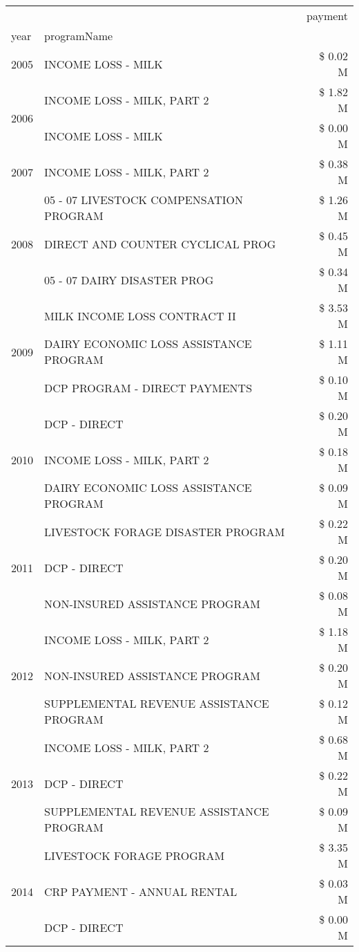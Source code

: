 \begin{tabular}{llr}
\toprule
 &  & payment \\
year & programName &  \\
\midrule
2005 & INCOME LOSS - MILK & \$ 0.02 M \\
\cline{1-3}
\multirow[t]{2}{*}{2006} & INCOME LOSS - MILK, PART 2 & \$ 1.82 M \\
 & INCOME LOSS - MILK & \$ 0.00 M \\
\cline{1-3}
2007 & INCOME LOSS - MILK, PART 2 & \$ 0.38 M \\
\cline{1-3}
\multirow[t]{3}{*}{2008} & 05 - 07 LIVESTOCK COMPENSATION PROGRAM & \$ 1.26 M \\
 & DIRECT AND COUNTER CYCLICAL PROG & \$ 0.45 M \\
 & 05 - 07 DAIRY DISASTER PROG & \$ 0.34 M \\
\cline{1-3}
\multirow[t]{3}{*}{2009} & MILK INCOME LOSS CONTRACT II & \$ 3.53 M \\
 & DAIRY ECONOMIC LOSS ASSISTANCE PROGRAM & \$ 1.11 M \\
 & DCP PROGRAM - DIRECT PAYMENTS & \$ 0.10 M \\
\cline{1-3}
\multirow[t]{3}{*}{2010} & DCP - DIRECT & \$ 0.20 M \\
 & INCOME LOSS - MILK, PART 2 & \$ 0.18 M \\
 & DAIRY ECONOMIC LOSS ASSISTANCE PROGRAM & \$ 0.09 M \\
\cline{1-3}
\multirow[t]{3}{*}{2011} & LIVESTOCK FORAGE DISASTER PROGRAM & \$ 0.22 M \\
 & DCP - DIRECT & \$ 0.20 M \\
 & NON-INSURED ASSISTANCE PROGRAM & \$ 0.08 M \\
\cline{1-3}
\multirow[t]{3}{*}{2012} & INCOME LOSS - MILK, PART 2 & \$ 1.18 M \\
 & NON-INSURED ASSISTANCE PROGRAM & \$ 0.20 M \\
 & SUPPLEMENTAL REVENUE ASSISTANCE PROGRAM & \$ 0.12 M \\
\cline{1-3}
\multirow[t]{3}{*}{2013} & INCOME LOSS - MILK, PART 2 & \$ 0.68 M \\
 & DCP - DIRECT & \$ 0.22 M \\
 & SUPPLEMENTAL REVENUE ASSISTANCE PROGRAM & \$ 0.09 M \\
\cline{1-3}
\multirow[t]{3}{*}{2014} & LIVESTOCK FORAGE PROGRAM & \$ 3.35 M \\
 & CRP PAYMENT - ANNUAL RENTAL & \$ 0.03 M \\
 & DCP - DIRECT & \$ 0.00 M \\

\end{tabular}
